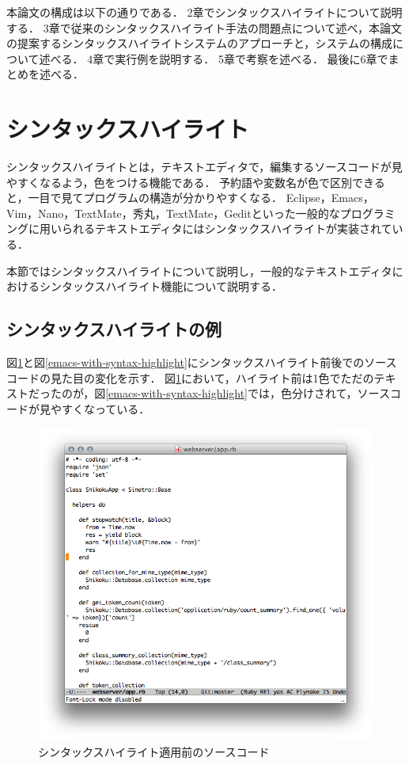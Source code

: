 \documentclass{cs-thesis}
\begin{document}
 本論文の構成は以下の通りである．
 2章でシンタックスハイライトについて説明する．
 3章で従来のシンタックスハイライト手法の問題点について述べ，本論文の提案するシンタックスハイライトシステムのアプローチと，システムの構成について述べる．
 4章で実行例を説明する．
 5章で考察を述べる．
 最後に6章でまとめを述べる．


 \clearpage
 \section{シンタックスハイライト}


  シンタックスハイライトとは，テキストエディタで，編集するソースコードが見やすくなるよう，色をつける機能である．
  予約語や変数名が色で区別できると，一目で見てプログラムの構造が分かりやすくなる．
  Eclipse，Emacs，Vim，Nano，TextMate，秀丸，TextMate，Geditといった一般的なプログラミングに用いられるテキストエディタにはシンタックスハイライトが実装されている．

  本節ではシンタックスハイライトについて説明し，一般的なテキストエディタにおけるシンタックスハイライト機能について説明する．

  
  \subsection{シンタックスハイライトの例}

  図\ref{emacs-without-syntax-highlight}と図\ref{emacs-with-syntax-highlight}にシンタックスハイライト前後でのソースコードの見た目の変化を示す．
  図\ref{emacs-without-syntax-highlight}において，ハイライト前は1色でただのテキストだったのが，図\ref{emacs-with-syntax-highlight}では，色分けされて，ソースコードが見やすくなっている．

    \begin{figure}[b]
   \centering
   \includegraphics[scale=0.6]{emacs-without-syntax-highlight.png}
   \caption{シンタックスハイライト適用前のソースコード}
   \label{emacs-without-syntax-highlight}
  \end{figure}
\end{document}

